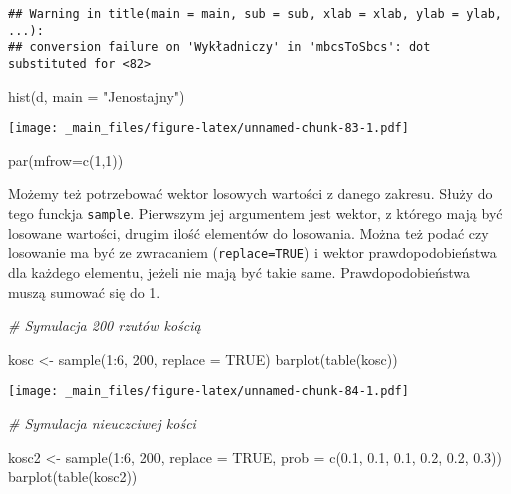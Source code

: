 \documentclass[
]{book}
\newenvironment{Shaded}{\begin{snugshade}}{\end{snugshade}}
\newcommand{\AttributeTok}[1]{\textcolor[rgb]{0.77,0.63,0.00}{#1}}
\newcommand{\CommentTok}[1]{\textcolor[rgb]{0.56,0.35,0.01}{\textit{#1}}}
\newcommand{\ConstantTok}[1]{\textcolor[rgb]{0.00,0.00,0.00}{#1}}
\newcommand{\DecValTok}[1]{\textcolor[rgb]{0.00,0.00,0.81}{#1}}
\newcommand{\FloatTok}[1]{\textcolor[rgb]{0.00,0.00,0.81}{#1}}
\newcommand{\FunctionTok}[1]{\textcolor[rgb]{0.00,0.00,0.00}{#1}}
\newcommand{\NormalTok}[1]{#1}
\newcommand{\OtherTok}[1]{\textcolor[rgb]{0.56,0.35,0.01}{#1}}
\newcommand{\SpecialCharTok}[1]{\textcolor[rgb]{0.00,0.00,0.00}{#1}}
\newcommand{\StringTok}[1]{\textcolor[rgb]{0.31,0.60,0.02}{#1}}
\begin{document}
\begin{verbatim}
## Warning in title(main = main, sub = sub, xlab = xlab, ylab = ylab, ...):
## conversion failure on 'Wykładniczy' in 'mbcsToSbcs': dot substituted for <82>
\end{verbatim}

\begin{Shaded}
\begin{Highlighting}[]
\FunctionTok{hist}\NormalTok{(d, }\AttributeTok{main =} \StringTok{"Jenostajny"}\NormalTok{)}
\end{Highlighting}
\end{Shaded}

\texttt{[image: \_main\_files/figure-latex/unnamed-chunk-83-1.pdf]}

\begin{Shaded}
\begin{Highlighting}[]
\FunctionTok{par}\NormalTok{(}\AttributeTok{mfrow=}\FunctionTok{c}\NormalTok{(}\DecValTok{1}\NormalTok{,}\DecValTok{1}\NormalTok{))}
\end{Highlighting}
\end{Shaded}

Możemy też potrzebować wektor losowych wartości z danego zakresu. Służy do tego funckja \texttt{sample}. Pierwszym jej argumentem jest wektor, z którego mają być losowane wartości, drugim ilość elementów do losowania. Można też podać czy losowanie ma być ze zwracaniem (\texttt{replace=TRUE}) i wektor prawdopodobieństwa dla każdego elementu, jeżeli nie mają być takie same. Prawdopodobieństwa muszą sumować się do 1.

\begin{Shaded}
\begin{Highlighting}[]
\CommentTok{\# Symulacja 200 rzutów kością}

\NormalTok{kosc }\OtherTok{\textless{}{-}} \FunctionTok{sample}\NormalTok{(}\DecValTok{1}\SpecialCharTok{:}\DecValTok{6}\NormalTok{, }\DecValTok{200}\NormalTok{, }\AttributeTok{replace =} \ConstantTok{TRUE}\NormalTok{)}
\FunctionTok{barplot}\NormalTok{(}\FunctionTok{table}\NormalTok{(kosc))}
\end{Highlighting}
\end{Shaded}

\texttt{[image: \_main\_files/figure-latex/unnamed-chunk-84-1.pdf]}

\begin{Shaded}
\begin{Highlighting}[]
\CommentTok{\# Symulacja nieuczciwej kości}

\NormalTok{kosc2 }\OtherTok{\textless{}{-}} \FunctionTok{sample}\NormalTok{(}\DecValTok{1}\SpecialCharTok{:}\DecValTok{6}\NormalTok{, }\DecValTok{200}\NormalTok{, }\AttributeTok{replace =} \ConstantTok{TRUE}\NormalTok{, }\AttributeTok{prob =} \FunctionTok{c}\NormalTok{(}\FloatTok{0.1}\NormalTok{, }\FloatTok{0.1}\NormalTok{, }\FloatTok{0.1}\NormalTok{, }\FloatTok{0.2}\NormalTok{, }\FloatTok{0.2}\NormalTok{, }\FloatTok{0.3}\NormalTok{))}
\FunctionTok{barplot}\NormalTok{(}\FunctionTok{table}\NormalTok{(kosc2))}
\end{Highlighting}
\end{Shaded}
\end{document}
